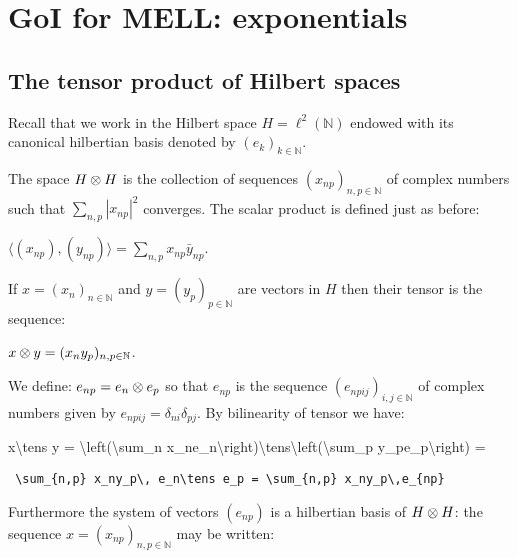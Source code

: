 \section{GoI for MELL: exponentials}\label{goi-for-mell-exponentials}

\subsection{The tensor product of Hilbert spaces}\label{the-tensor-product-of-hilbert-spaces}

Recall that we work in the Hilbert space \(H=\ell^2(\mathbb{N})\)
endowed with its canonical hilbertian basis denoted by
\((e_k)_{k\in\mathbb{N}}\).

The space \(H\otimes H\) is the collection of sequences
\((x_{np})_{n,p\in\mathbb{N}}\) of complex numbers such that
\(\sum_{n,p}|x_{np}|^2\) converges. The scalar product is defined just
as before:

\begin{description}
\tightlist
\item[]
\(\langle (x_{np}), (y_{np})\rangle = \sum_{n,p} x_{np}\bar y_{np}\).
\end{description}

If \(x = (x_n)_{n\in\mathbb{N}}\) and \(y = (y_p)_{p\in\mathbb{N}}\) are
vectors in \(H\) then their tensor is the sequence:

\begin{description}
\tightlist
\item[]
\(x\otimes y = (x_ny_p)_{n,p\in\mathbb{N}}\).
\end{description}

We define: \(e_{np} = e_n\otimes e_p\) so that \(e_{np}\) is the sequence
\((e_{npij})_{i,j\in\mathbb{N}}\) of complex numbers given by
\(e_{npij} = \delta_{ni}\delta_{pj}\). By bilinearity of tensor we have:

\begin{description}
\tightlist
\item[]
x\textbackslash{}tens y = \textbackslash{}left(\textbackslash{}sum\_n
x\_ne\_n\textbackslash{}right)\textbackslash{}tens\textbackslash{}left(\textbackslash{}sum\_p
y\_pe\_p\textbackslash{}right) =
\end{description}

\texttt{~\textbackslash{}sum\_\{n,p\}~x\_ny\_p\textbackslash{},~e\_n\textbackslash{}tens~e\_p~=~\textbackslash{}sum\_\{n,p\}~x\_ny\_p\textbackslash{},e\_\{np\}}

Furthermore the system of vectors \((e_{np})\) is a hilbertian basis of
\(H\otimes H\): the sequence \(x=(x_{np})_{n,p\in\mathbb{N}}\) may be
written:


